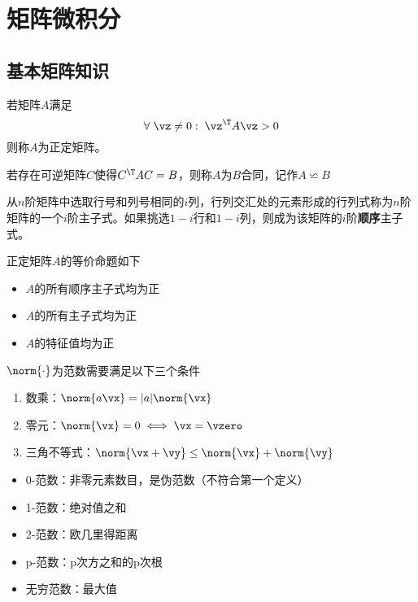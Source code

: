 
\newpage
\appendix
\section{矩阵微积分}
\label{appendix:matrix}
\subsection{基本矩阵知识}
\begin{definition}
若矩阵$A$满足
\[\forall\;\vz\ne 0:\;\vz^\T A\vz>0\]
则称$A$为正定矩阵。
\end{definition}
\begin{definition}[合同(congruent)矩阵]
    若存在可逆矩阵$C$使得$C^\T AC=B$，则称$A$为$B$合同，记作$A\backsimeq B$
\end{definition}
\begin{definition}[主子式]
    从$n$阶矩阵中选取行号和列号相同的$i$列，行列交汇处的元素形成的行列式称为$n$阶矩阵的一个$i$阶主子式。如果挑选$1-i$行和$1-i$列，则成为该矩阵的$i$阶\textbf{顺序}主子式。
\end{definition}
正定矩阵$A$的等价命题如下
\begin{itemize}
    \item $A$的所有顺序主子式均为正
    \item $A$的所有主子式均为正
    \item $A$的特征值均为正
\end{itemize}

\begin{definition}[向量范数]
    $\norm{\cdot}$为范数需要满足以下三个条件
    \begin{enumerate}
        \item 数乘：$\norm{a\vx}=|a|\norm{\vx}$
        \item 零元：$\norm{\vx}=0\iff \vx=\vzero$
        \item 三角不等式：$\norm{\vx+\vy}\leq \norm{\vx}+\norm{\vy}$
    \end{enumerate}
\end{definition}
\begin{itemize}
\item 0-范数：非零元素数目，是伪范数（不符合第一个定义）
\item 1-范数：绝对值之和
\item 2-范数：欧几里得距离
\item p-范数：p次方之和的p次根
\item 无穷范数：最大值
\end{itemize}

